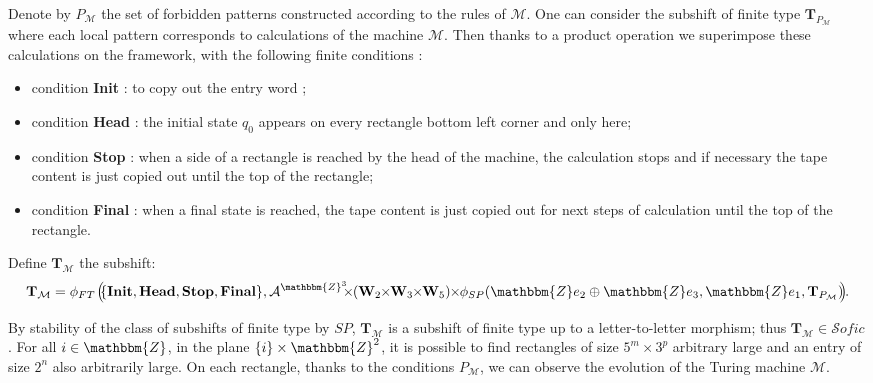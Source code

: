 \documentclass[proceedings]{stacs}
\theoremstyle{plain}\newtheorem{satz}[thm]{Satz}
\theoremstyle{definition}\newtheorem{crucial}[thm]{Crucial Definition}
\newcommand{\Z}{\mathbbm{Z}}
\newcommand{\A}{\mathcal{A}}
\newcommand{\T}{\mathbf{T}}
\newcommand{\W}{\mathbf{W}}
\newcommand{\TM}{\mathcal{M}}
\newcommand{\sofic}{\mathcal{S}ofic}
\begin{document}
Denote by $P_{\TM}$ the set of forbidden patterns constructed according to the rules of $\TM$. One can consider the subshift of finite type $\T_{P_{\TM}}$ where each local pattern corresponds to calculations of the machine $\TM$. Then thanks to a product operation we superimpose these calculations on the framework, with the following finite conditions :
\begin{itemize}
\item condition \textbf{Init} : to copy out the entry word ;
\item condition \textbf{Head} : the initial state $q_0$ appears on every rectangle bottom left corner and only here;
\item condition \textbf{Stop} : when a side of a rectangle is reached by the head of the machine, the calculation stops and if necessary the tape content is just copied out until the top of the rectangle;
\item condition \textbf{Final} : when a final state is reached, the tape content is just copied out for next steps of calculation until the top of the rectangle.
\end{itemize}

Define $\T_{\TM}$ the subshift:
$$\T_{\TM} = \phi_{FT}\hspace*{-0.25mm}\left(\hspace*{-1mm}\{\textbf{Init},\textbf{Head},\textbf{Stop},\textbf{Final} \},\A^{\Z^3}\hspace*{-2mm}\times\hspace*{-1mm}\left(\W_2\hspace*{-1mm}\times\hspace*{-1mm} \W_3\hspace*{-1mm}\times\hspace*{-1mm} \W_5\right) \hspace*{-1mm}\times\hspace*{-1mm} \phi_{SP}(\Z e_2\oplus\Z e_3,\Z e_1,\T_{P_{\TM}})\hspace*{-1mm}\right)\hspace*{-1mm}.$$

By stability of the class of subshifts of finite type by $SP$, $\T_{\TM}$ is a subshift of finite type up to a letter-to-letter morphism; thus $\T_{\TM}\in\sofic$. For all $i\in\Z$, in the plane $\{i\}\times\Z^2$, it is possible to find rectangles of size $5^m\times 3^p$ arbitrary large and an entry of size $2^n$ also arbitrarily large. On each rectangle, thanks to the conditions $P_{\TM}$, we can observe the evolution of the Turing machine $\TM$.
\end{document}
